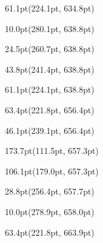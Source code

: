 \documentclass{article}
\begin{document}
\begin{textblock*}{61.1pt}(224.1pt, 634.8pt)%
\noindent%
%
\end{textblock*}
\begin{textblock*}{10.0pt}(280.1pt, 638.8pt)%
\noindent%
%
\end{textblock*}
\begin{textblock*}{24.5pt}(260.7pt, 638.8pt)%
\noindent%
%
\end{textblock*}
\begin{textblock*}{43.8pt}(241.4pt, 638.8pt)%
\noindent%
%
\end{textblock*}
\begin{textblock*}{61.1pt}(224.1pt, 638.8pt)%
\noindent%
%
\end{textblock*}
\begin{textblock*}{63.4pt}(221.8pt, 656.4pt)%
\noindent%
%
\end{textblock*}
\begin{textblock*}{46.1pt}(239.1pt, 656.4pt)%
\noindent%
%
\end{textblock*}
\begin{textblock*}{173.7pt}(111.5pt, 657.3pt)%
\noindent%
%
\end{textblock*}
\begin{textblock*}{106.1pt}(179.0pt, 657.3pt)%
\noindent%
%
\end{textblock*}
\begin{textblock*}{28.8pt}(256.4pt, 657.7pt)%
\noindent%
%
\end{textblock*}
\begin{textblock*}{10.0pt}(278.9pt, 658.0pt)%
\noindent%
%
\end{textblock*}
\begin{textblock*}{63.4pt}(221.8pt, 663.9pt)%
\noindent%
%
\end{textblock*}
\end{document}
